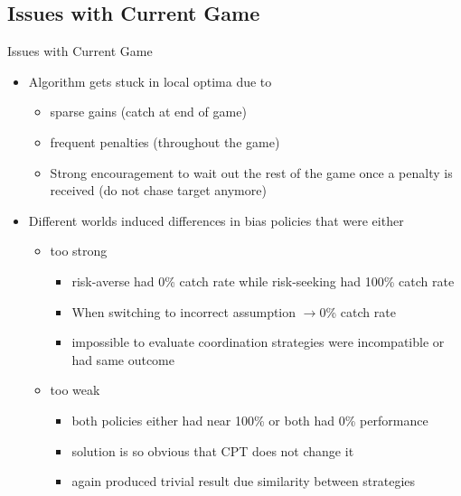 \documentclass[aspectratio=1610, xcolor=dvipsnames]{packages/beamer}
\begin{document}
\subsection{Issues with Current Game}
\begin{frame}{Issues with Current Game}
    \begin{itemize}
        \item Algorithm gets stuck in local optima due to
        \begin{itemize}
            \item sparse gains (catch at end of game)
            \item frequent penalties (throughout the game)
            \item Strong encouragement to wait out the rest of the game once a penalty is received (do not chase target anymore)
        \end{itemize}

        \item Different worlds induced differences in bias policies that were either
        \begin{itemize}
            \item too strong
            \begin{itemize}
                \item risk-averse had 0\% catch rate while risk-seeking had 100\% catch rate
                \item When switching to incorrect assumption $\rightarrow 0$\%  catch rate
                \item impossible to evaluate coordination strategies were incompatible or had same outcome
            \end{itemize}
            \item too weak
            \begin{itemize}
                \item both policies either had near 100\% or both had 0\% performance
                \item solution is so obvious that CPT does not change it
                \item again produced trivial result due similarity between strategies
            \end{itemize}
        \end{itemize}
    \end{itemize}
\end{frame}
\end{document}
